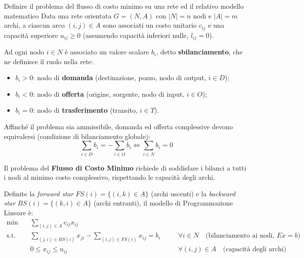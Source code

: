 \documentclass[12pt]{extarticle} %
\begin{document}

\begin{teoriabox}{Definire il problema del flusso di costo minimo su una rete ed il relativo modello matematico}
Data una rete orientata $G = (N, A)$ con $|N| = n$ nodi e $|A| = m$ archi, a ciascun arco $(i, j) \in A$ sono associati un costo unitario $c_{ij}$ e una capacità superiore $u_{ij} \ge 0$ (assumendo capacità inferiori nulle, $l_{ij} = 0$).

Ad ogni nodo $i \in N$ è associato un valore scalare $b_i$, detto \textbf{sbilanciamento}, che ne definisce il ruolo nella rete:
\begin{itemize}
    \item $b_i > 0$: nodo di \textbf{domanda} (destinazione, pozzo, nodo di output, $i \in D$);
    \item $b_i < 0$: nodo di \textbf{offerta} (origine, sorgente, nodo di input, $i \in O$);
    \item $b_i = 0$: nodo di \textbf{trasferimento} (transito, $i \in T$).
\end{itemize}
Affinché il problema sia ammissibile, domanda ed offerta complessive devono equivalersi (condizione di bilanciamento globale):
\[
\sum_{i \in D} b_i = -\sum_{i \in O} b_i \iff \sum_{i \in N} b_i = 0
\]

Il problema del \textbf{Flusso di Costo Minimo} richiede di soddisfare i bilanci a tutti i nodi al minimo costo complessivo, rispettando le capacità degli archi. 

Definite la \emph{forward star} $FS(i) = \{(i, k) \in A\}$ (archi uscenti) e la \emph{backward star} $BS(i) = \{(k, i) \in A\}$ (archi entranti), il modello di Programmazione Lineare è:
\[
\begin{aligned}
\min \quad & \sum_{(i,j)\in A} c_{ij}x_{ij} \\
\text{s.t.} \quad & \sum_{(j,i)\in BS(i)} x_{ji} - \sum_{(i,j)\in FS(i)} x_{ij} = b_i \quad && \forall i \in N \quad \text{(bilanciamento ai nodi, } Ex = b\text{)} \\
& 0 \le x_{ij} \le u_{ij} \quad && \forall (i,j) \in A \quad \text{(capacità degli archi)}
\end{aligned}
\]
\end{teoriabox}

\end{document}
